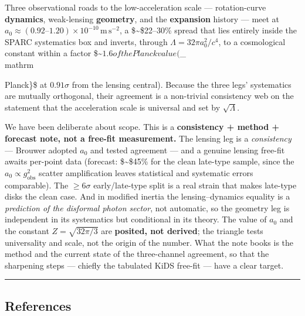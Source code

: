 \documentclass[
]{article}
\begin{document}
Three observational roads to the low-acceleration scale ---
rotation-curve \textbf{dynamics}, weak-lensing \textbf{geometry}, and
the \textbf{expansion} history --- meet at
\(a_0\approx(0.92\text{–}1.20)\times10^{-10}\,\mathrm{m\,s^{-2}}\), a
\$\sim\$22--30\% spread that lies entirely inside the SPARC systematics
box and inverts, through \(\Lambda = 32\pi a_0^2/c^4\), to a
cosmological constant within a factor
\$\sim\(1.6 of the Planck value (\)\Lambda\_\\mathrm{Planck\}\$ at
\(0.91\sigma\) from the lensing central). Because the three legs'
systematics are mutually orthogonal, their agreement is a non-trivial
consistency web on the statement that the acceleration scale is
universal and set by \(\sqrt\Lambda\).

We have been deliberate about scope. This is a \textbf{consistency +
method + forecast note, not a free-fit measurement.} The lensing leg is
a \emph{consistency} --- Brouwer adopted \(a_0\) and tested agreement
--- and a genuine lensing free-fit awaits per-point data (forecast:
\$\sim\$45\% for the clean late-type sample, since the
\(a_0\propto g_\mathrm{obs}^2\) scatter amplification leaves statistical
and systematic errors comparable). The \(\ge6\sigma\) early/late-type
split is a real strain that makes late-type disks the clean case. And in
modified inertia the lensing--dynamics equality is a \emph{prediction of
the disformal photon sector}, not automatic, so the geometry leg is
independent in its systematics but conditional in its theory. The value
of \(a_0\) and the constant \(Z=\sqrt{32\pi/3}\) are \textbf{posited,
not derived}; the triangle tests universality and scale, not the origin
of the number. What the note books is the method and the current state
of the three-channel agreement, so that the sharpening steps --- chiefly
the tabulated KiDS free-fit --- have a clear target.

\begin{center}\rule{0.5\linewidth}{0.5pt}\end{center}

\subsection{References}\label{references}

}
\end{document}

